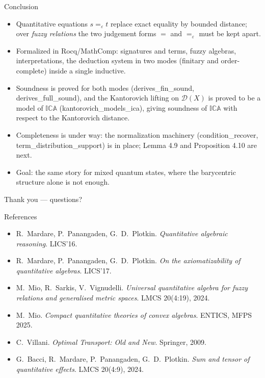 \documentclass[10pt,aspectratio=169]{beamer}
\newcommand{\qeq}[1]{=_{#1}}
\newcommand{\ICA}{\mathbb{I}\mathbb{C}\mathbb{A}}
\newcommand{\Dist}{\mathcal{D}}
\newcommand{\eps}{\varepsilon}
\newcommand{\rid}[1]{{\ttfamily\small #1}}
\begin{document}
\begin{frame}{Conclusion}
  \begin{itemize}
    \item[--] Quantitative equations $s \qeq{\eps} t$ replace exact
      equality by bounded distance; over \emph{fuzzy relations}
      the two judgement forms $=$ and $\qeq{\eps}$ must be kept apart.
      \medskip
    \item[--] Formalized in Rocq/MathComp: signatures and terms,
      fuzzy algebras, interpretations, the deduction system in
      two modes (finitary and order-complete) inside a single
      inductive.
      \medskip
    \item[--] Soundness is proved for both modes
      (\rid{derives\_fin\_sound}, \rid{derives\_full\_sound}), and the
      Kantorovich lifting on $\Dist(X)$ is proved to be a
      model of $\ICA$ (\rid{kantorovich\_models\_ica}), giving
      soundness of $\ICA$ with respect to the Kantorovich distance.
      \medskip
    \item[--] Completeness is under way: the normalization machinery
      (\rid{condition\_recover}, \rid{term\_distribution\_support}) is
      in place; Lemma 4.9 and Proposition 4.10 are next.
      \medskip
    \item[--] Goal: the same story for mixed quantum states,
      where the barycentric structure alone is not enough.
  \end{itemize}
  \vfill
  \begin{center}\large Thank you --- questions?\end{center}
\end{frame}

\appendix

\begin{frame}{References}
  \small
  \begin{itemize}
    \item R.~Mardare, P.~Panangaden, G.~D.~Plotkin.
      \emph{Quantitative algebraic reasoning}. LICS'16.
    \item R.~Mardare, P.~Panangaden, G.~D.~Plotkin.
      \emph{On the axiomatizability of quantitative algebras}. LICS'17.
    \item M.~Mio, R.~Sarkis, V.~Vignudelli.
      \emph{Universal quantitative algebra for fuzzy relations and
      generalised metric spaces}. LMCS 20(4:19), 2024.
    \item M.~Mio. \emph{Compact quantitative theories of convex
      algebras}. ENTICS, MFPS 2025.
    \item C.~Villani. \emph{Optimal Transport: Old and New}. Springer,
      2009.
    \item G.~Bacci, R.~Mardare, P.~Panangaden, G.~D.~Plotkin.
      \emph{Sum and tensor of quantitative effects}. LMCS 20(4:9), 2024.
  \end{itemize}
\end{frame}
\end{document}
